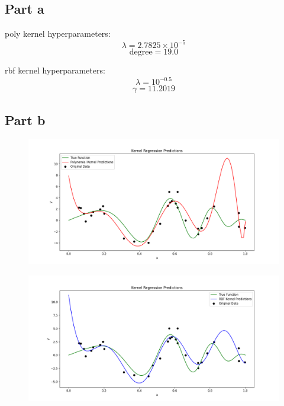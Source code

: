 \newpage
\section{}
\subsection*{Part a}


poly kernel hyperparameters:
\[\lambda = 2.7825 \times 10^{-5}\]
\[\text{degree} = 19.0\]

rbf kernel hyperparameters:
\[\lambda = 10^{-0.5}\]
\[\gamma = 11.2019\]

\subsection*{Part b}

\begin{figure}[!h]
    \centering\includegraphics[width=1\linewidth]{polynomial_kernel_predictions.png}
\end{figure}

\begin{figure}[!h]
    \centering\includegraphics[width=1\linewidth]{rbf_kernel_predictions.png}
\end{figure}

\inputminted{python3}{../homeworks/kernel_bootstrap/main.py}

